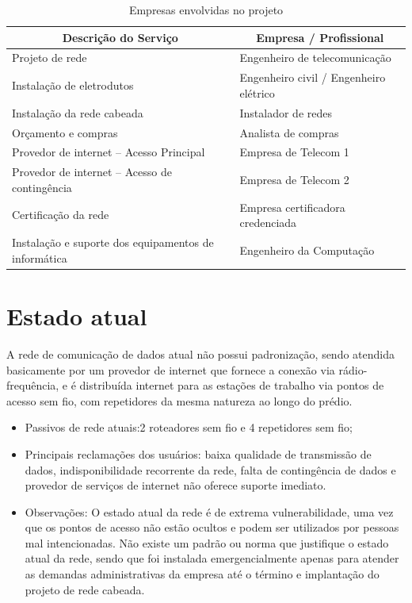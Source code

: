 \documentclass[	DIV=calc,%
							paper=a4,%
							fontsize=12pt,%
							onecolumn]{scrartcl}	 					%
\begin{document}
\begin{table}[]
	\centering
	\caption{Empresas envolvidas no projeto}
	\label{tab_empresas}
	\begin{tabular}{|l|l|}
		\hline
		\multicolumn{1}{|c|}{\textbf{Descrição  do Serviço}} & \multicolumn{1}{c|}{\textbf{Empresa  / Profissional}} \\ \hline
		Projeto de rede                                      & Engenheiro de telecomunicação                         \\ \hline
		Instalação de eletrodutos                            & Engenheiro civil / Engenheiro elétrico                \\ \hline
		Instalação da rede cabeada                           & Instalador de redes                                   \\ \hline
		Orçamento e compras                                  & Analista de compras                                   \\ \hline
		Provedor de internet – Acesso Principal              & Empresa de Telecom 1                                  \\ \hline
		Provedor de internet – Acesso de contingência        & Empresa de Telecom 2                                  \\ \hline
		Certificação da rede                                 & Empresa certificadora credenciada                     \\ \hline
		Instalação e suporte dos equipamentos de informática & Engenheiro da Computação                              \\ \hline
	\end{tabular}
\end{table}



\section{Estado atual}
A rede de comunicação de dados atual não possui padronização, sendo atendida basicamente por um provedor de internet que fornece a conexão via rádio-frequência, e é distribuída internet para as estações de trabalho via pontos de acesso sem fio, com repetidores da mesma natureza ao longo do prédio.

\begin{itemize}
	\item Passivos de rede atuais:2 roteadores sem fio e 4 repetidores sem fio;
	\item Principais reclamações dos usuários: baixa qualidade de transmissão de dados, indisponibilidade recorrente da rede, falta de contingência de dados e provedor de serviços de internet não oferece suporte imediato.
	\item Observações: O estado atual da rede é de extrema vulnerabilidade, uma vez que os pontos de acesso não estão ocultos e podem ser utilizados por pessoas mal intencionadas. Não existe um padrão ou norma que justifique o estado atual da rede, sendo que foi instalada emergencialmente apenas para atender as demandas administrativas da empresa até o término e implantação do projeto de rede cabeada.
\end{itemize}
\end{document}
